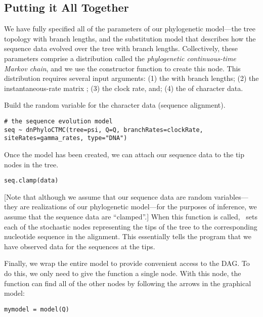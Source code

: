 \subsection{Putting it All Together}

We have fully specified all of the parameters of our phylogenetic model---the tree topology with branch lengths, and the substitution model that describes how the sequence data evolved over the tree with branch lengths.  
Collectively, these parameters comprise a distribution called the \textit{phylogenetic continuous-time Markov chain}, and we use the  constructor function to create this node.
This distribution requires several input arguments: 
(1) the  with branch lengths; 
(2) the instantaneous-rate matrix ;
(3) the clock rate, and; 
(4) the  of character data.


Build the random variable for the character data (sequence alignment).
{\tt \begin{snugshade*}
\begin{lstlisting}
# the sequence evolution model
seq ~ dnPhyloCTMC(tree=psi, Q=Q, branchRates=clockRate, siteRates=gamma_rates, type="DNA")
\end{lstlisting}
\end{snugshade*}}


Once the  model has been created, we can attach our sequence data to the tip nodes in the tree.
{\tt \begin{snugshade*}
\begin{lstlisting}
seq.clamp(data)
\end{lstlisting}
\end{snugshade*}}
[Note that although we assume that our sequence data are random variables---they are realizations of our phylogenetic model---for the purposes of inference, we assume that the sequence data are ``clamped''.]
When this function is called, \RevBayes~sets each of the stochastic nodes representing the tips of the tree to the corresponding nucleotide sequence in the alignment. 
This essentially tells the program that we have observed data for the sequences at the tips. 

Finally, we wrap the entire model to provide convenient access to the DAG. 
To do this, we only need to give the  function a single node. 
With this node, the  function can find all of the other nodes by following the arrows in the graphical model:
{\tt \begin{snugshade*}
\begin{lstlisting}
mymodel = model(Q)
\end{lstlisting}
\end{snugshade*}}

